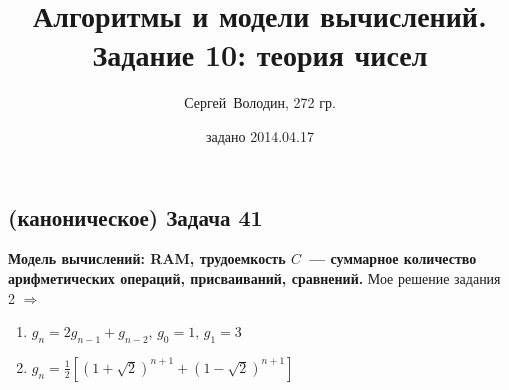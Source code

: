 \documentclass[a4paper]{article}
\date{задано 2014.04.17}
\author{Сергей~Володин, 272 гр.}
\title{Алгоритмы и модели вычислений.\\Задание 10: теория чисел}
\begin{document}
\maketitle
\subsection*{(каноническое) Задача 41}
{\bf Модель вычислений: RAM, трудоемкость $C$~--- суммарное количество арифметических операций, присваиваний, сравнений.}\newline
Мое решение задания 2 $\Rightarrow$ \begin{enumerate}
\item \label{41GnRec} $g_n = 2g_{n-1} + g_{n-2}$, $g_0=1,\,g_1=3$
\item \label{41Gn2} $g_n=\frac{1}{2}\left[(1+\sqrt{2})^{n+1}+(1-\sqrt{2})^{n+1}\right]$
\end{enumerate}
\end{document}
